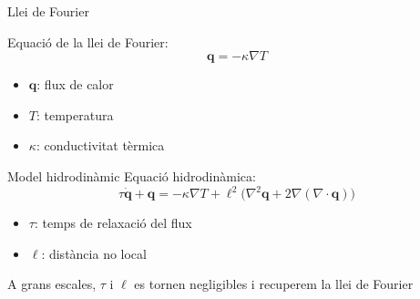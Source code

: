 \documentclass{beamer}
\begin{document}
\begin{frame}{Llei de Fourier}

\begin{figure}
\begin{center}

\end{center}
\end{figure}
\pause
Equaci\'{o} de la llei de Fourier:
\[\boldsymbol q=-\kappa\nabla T\]
\pause
\vspace{-6mm}
\begin{itemize}
\item $\boldsymbol q$: flux de calor
\pause
\item $T$: temperatura
\pause
\item $\kappa$: conductivitat t\`{e}rmica
\end{itemize}
\end{frame}

%
%
%
%
%
%
\begin{frame}{Model hidrodin\`{a}mic}
Equaci\'{o} hidrodin\`{a}mica:
\[\tau\dot{\boldsymbol q}+\boldsymbol q=-\kappa\nabla T+\ell^2\big(\nabla^2\boldsymbol q+2\nabla(\nabla\cdot\boldsymbol q)\big)\]
\pause
\begin{itemize}
\item $\tau$: temps de relaxaci\'{o} del flux
\pause
\item $\ell$: dist\`{a}ncia no local
\end{itemize}
\pause
\vspace{4mm}

%
A grans escales, $\tau$ i $\ell$ es tornen negligibles i recuperem la llei de Fourier
\end{frame}
\end{document}
